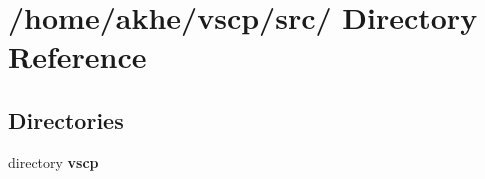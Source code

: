 \section{/home/akhe/vscp/src/ Directory Reference}
\label{dir_4567d7875d2e9a2e31c6220386b17906}
\subsection*{Directories}
\begin{CompactItemize}
\item 
directory {\bf vscp}
\end{CompactItemize}
